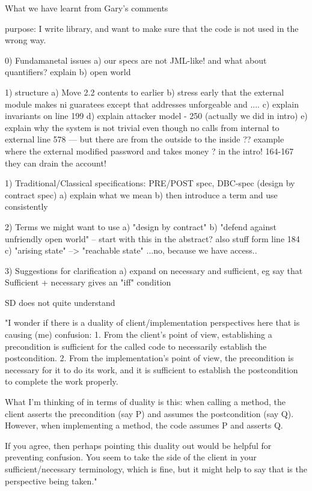 What we have learnt from Gary's comments

purpose: I write library, and want to make sure that the code is not used in the wrong way.

0) Fundamanetal issues
a) our specs are not JML-like! and what about quantifiers? explain
b) open world

1) structure
a) Move 2.2 contents to earlier
b) stress early that the external module makes ni guaratees except that addresses unforgeable and ....
c) explain invariants on line 199
d) explain attacker model - 250 (actually we did in intro)
e) explain why the system is not trivial even though no calls from internal to external line 578
   --- but there are from the outside to the inside
   ?? example where the external modified password and takes money ? in the intro!
   164-167 they can drain the account!

1) Traditional/Classical specifications: PRE/POST spec, DBC-spec (design by contract spec)
a) explain what we mean
b) then introduce a term and use consistently

2) Terms we might want to use
a) "design by contract"
b) "defend against unfriendly open world" -- start with this in the abstract?
     also stuff form line 184
c) "arising state" --> "reachable state" ...no, because we have access..

3) Suggestions for clarification
a) expand on necessary and sufficient, eg say that Sufficient + necessary gives an "iff" condition

SD does not quite understand 

"I wonder if there is a duality of client/implementation perspectives here that is causing (me) confusion:
1. From the client's point of view, establishing a precondition is sufficient for the called code to necessarily establish the postcondition.
2. From the implementation's point of view, the precondition is necessary for it to do its work, and it is sufficient to establish the postcondition to complete the work properly.

What I'm thinking of in terms of duality is this: when calling a method, the client asserts the precondition (say P) and assumes the postcondition (say Q). However, when implementing a method, the code assumes P and asserts Q.

If you agree, then perhaps pointing this duality out would be helpful for preventing confusion.  You seem to take the side of the client in your sufficient/necessary terminology, which is fine, but it might help to say that is the perspective being taken."

